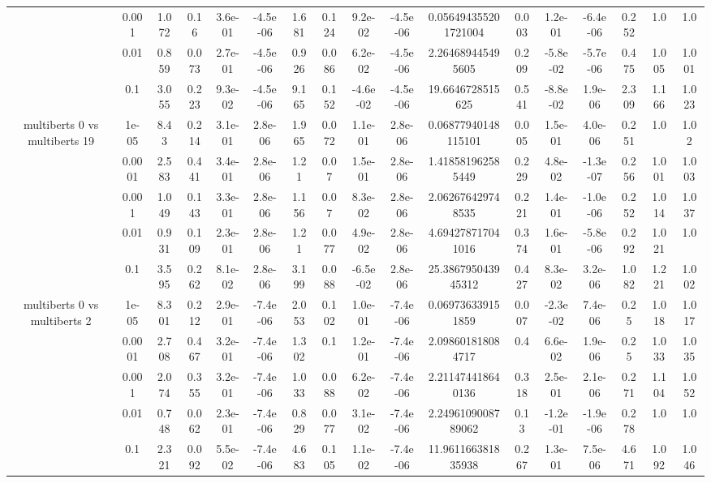\begin{tabular}{|c|c|c|c|c|c|c|c|c|c|c|c|c|c|c|c|c|}
 & 0.001 & 1.072 & 0.16 & 3.6e-01 & -4.5e-06 & 1.681 & 0.124 & 9.2e-02 & -4.5e-06 & 0.056494355201721004 & 0.003 & 1.2e-01 & -6.4e-06 & 0.252 & 1.0 & 1.0 \\
 & 0.01 & 0.859 & 0.073 & 2.7e-01 & -4.5e-06 & 0.926 & 0.086 & 6.2e-02 & -4.5e-06 & 2.264689445495605 & 0.209 & -5.8e-02 & -5.7e-06 & 0.475 & 1.005 & 1.001 \\
 & 0.1 & 3.055 & 0.223 & 9.3e-02 & -4.5e-06 & 9.165 & 0.152 & -4.6e-02 & -4.5e-06 & 19.6646728515625 & 0.541 & -8.8e-02 & 1.9e-06 & 2.309 & 1.166 & 1.023 \\
\hline
\multirow{5}{*}{multiberts 0 vs multiberts 19} & 1e-05 & 8.43 & 0.214 & 3.1e-01 & 2.8e-06 & 1.965 & 0.072 & 1.1e-01 & 2.8e-06 & 0.06877940148115101 & 0.005 & 1.5e-01 & 4.0e-06 & 0.251 & 1.0 & 1.02 \\
 & 0.0001 & 2.583 & 0.441 & 3.4e-01 & 2.8e-06 & 1.21 & 0.07 & 1.5e-01 & 2.8e-06 & 1.418581962585449 & 0.229 & 4.8e-02 & -1.3e-07 & 0.256 & 1.001 & 1.003 \\
 & 0.001 & 1.049 & 0.143 & 3.3e-01 & 2.8e-06 & 1.156 & 0.07 & 8.3e-02 & 2.8e-06 & 2.062676429748535 & 0.221 & 1.4e-01 & -1.0e-06 & 0.252 & 1.014 & 1.037 \\
 & 0.01 & 0.931 & 0.109 & 2.3e-01 & 2.8e-06 & 1.21 & 0.077 & 4.9e-02 & 2.8e-06 & 4.694278717041016 & 0.374 & 1.6e-01 & -5.8e-06 & 0.292 & 1.021 & 1.0 \\
 & 0.1 & 3.595 & 0.262 & 8.1e-02 & 2.8e-06 & 3.199 & 0.088 & -6.5e-02 & 2.8e-06 & 25.386795043945312 & 0.427 & 8.3e-02 & 3.2e-06 & 1.082 & 1.221 & 1.002 \\
\hline
\multirow{5}{*}{multiberts 0 vs multiberts 2} & 1e-05 & 8.301 & 0.212 & 2.9e-01 & -7.4e-06 & 2.053 & 0.102 & 1.0e-01 & -7.4e-06 & 0.069736339151859 & 0.007 & -2.3e-02 & 7.4e-06 & 0.25 & 1.018 & 1.017 \\
 & 0.0001 & 2.708 & 0.467 & 3.2e-01 & -7.4e-06 & 1.302 & 0.1 & 1.2e-01 & -7.4e-06 & 2.098601818084717 & 0.4 & 6.6e-02 & 1.9e-06 & 0.25 & 1.033 & 1.035 \\
 & 0.001 & 2.074 & 0.355 & 3.2e-01 & -7.4e-06 & 1.033 & 0.088 & 6.2e-02 & -7.4e-06 & 2.211474418640136 & 0.318 & 2.5e-01 & 2.1e-06 & 0.271 & 1.104 & 1.052 \\
 & 0.01 & 0.748 & 0.062 & 2.3e-01 & -7.4e-06 & 0.829 & 0.077 & 3.1e-02 & -7.4e-06 & 2.2496109008789062 & 0.13 & -1.2e-01 & -1.9e-06 & 0.278 & 1.0 & 1.0 \\
 & 0.1 & 2.321 & 0.092 & 5.5e-02 & -7.4e-06 & 4.683 & 0.105 & 1.1e-02 & -7.4e-06 & 11.961166381835938 & 0.267 & 1.3e-01 & 7.5e-06 & 4.671 & 1.092 & 1.046 \\

\end{tabular}

